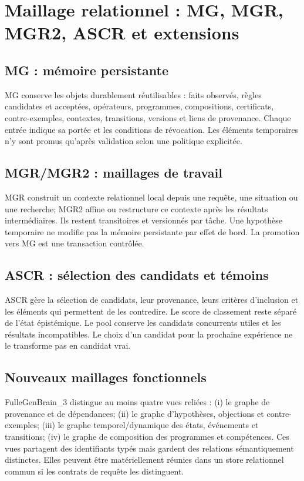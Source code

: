 \documentclass[11pt,a4paper]{article}
\begin{document}
\section{Maillage relationnel : MG, MGR, MGR2, ASCR et extensions}
\subsection{MG : mémoire persistante}
MG conserve les objets durablement réutilisables : faits observés, règles candidates et acceptées, opérateurs, programmes, compositions, certificats, contre-exemples, contextes, transitions, versions et liens de provenance. Chaque entrée indique sa portée et les conditions de révocation. Les éléments temporaires n'y sont promus qu'après validation selon une politique explicitée.

\subsection{MGR/MGR2 : maillages de travail}
MGR construit un contexte relationnel local depuis une requête, une situation ou une recherche; MGR2 affine ou restructure ce contexte après les résultats intermédiaires. Ils restent transitoires et versionnés par tâche. Une hypothèse temporaire ne modifie pas la mémoire persistante par effet de bord. La promotion vers MG est une transaction contrôlée.

\subsection{ASCR : sélection des candidats et témoins}
ASCR gère la sélection de candidats, leur provenance, leurs critères d'inclusion et les éléments qui permettent de les contredire. Le score de classement reste séparé de l'état épistémique. Le pool conserve les candidats concurrents utiles et les résultats incompatibles. Le choix d'un candidat pour la prochaine expérience ne le transforme pas en candidat vrai.

\subsection{Nouveaux maillages fonctionnels}
FulleGenBrain\_3 distingue au moins quatre vues reliées : (i) le graphe de provenance et de dépendances; (ii) le graphe d'hypothèses, objections et contre-exemples; (iii) le graphe temporel/dynamique des états, événements et transitions; (iv) le graphe de composition des programmes et compétences. Ces vues partagent des identifiants typés mais gardent des relations sémantiquement distinctes. Elles peuvent être matériellement réunies dans un store relationnel commun si les contrats de requête les distinguent.
\end{document}
